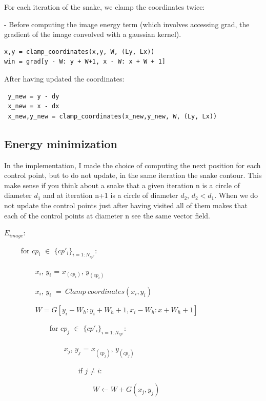 \documentclass[24pt]{article}
\begin{document}
For each iteration of the snake, we clamp the coordinates twice:  

- Before computing the image energy term (which involves accessing grad, the gradient of the image convolved with a gaussian kernel). 
 
 \begin{lstlisting}
x,y = clamp_coordinates(x,y, W, (Ly, Lx))
win = grad[y - W: y + W+1, x - W: x + W + 1]
\end{lstlisting}

After having updated the coordinates:

 \begin{lstlisting}
 y_new = y - dy
 x_new = x - dx
 x_new,y_new = clamp_coordinates(x_new,y_new, W, (Ly, Lx))
 \end{lstlisting}

 

\subsection{Energy minimization} 




In the implementation, I made the choice of computing the next position  for each control point, but to do not update, in the same iteration the snake contour.   This make sense if you think about a snake that a given iteration n is a circle of diameter $d_1$ and at iteration n+1 is a circle of diameter $d_2$, $d_2 < d_1$.
When we do not update the control points just after having visited all of them makes that each of the control points at diameter n see the same vector field.





$E_{image}:$

~~~~ for $cp_i$ $\in$ $\{cp'_i\}_{i= 1:N_{cp'}}$:  
	
~~~~~~~~ $x_i$, $y_i$ = $x_{(cp_i)}$, $y_{(cp_i)}$

~~~~~~~~ $x_i$, $y_i$ $=  ~Clamp~ coordinates(x_i, y_i)$

~~~~~~~~ $W = G[y_i - W_h: y_i + W_h+1, x_i - W_h: x + W_h + 1]$

~~~~~~~~~~~~ for $cp_j$ $\in$ $\{cp'_i\}_{i= 1:N_{cp'}}$:

~~~~~~~~~~~~~~~~ $x_j$, $y_j$ = $x_{(cp_j)}$, $y_{(cp_j)}$

~~~~~~~~~~~~~~~~~~~~ if  $j \neq i$:

~~~~~~~~~~~~~~~~~~~~~~~~ $W \leftarrow W + G(x_j, y_j)$
\end{document}
